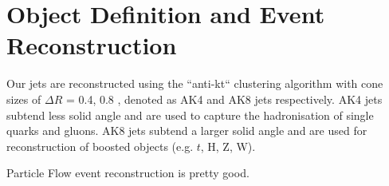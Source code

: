 \chapter{Object Definition and Event Reconstruction}
\label{chap:eventreco}

Our jets are reconstructed using the ``anti-kt`` clustering algorithm with cone sizes of $\Delta R$ = 0.4, 0.8 \cite{1126-6708-2008-04-063}, denoted as AK4 and AK8 jets respectively. AK4 jets subtend less solid angle and are used to capture the hadronisation of single quarks and gluons. AK8 jets subtend a larger solid angle and are used for reconstruction of boosted objects (e.g. $t$, H, Z, W).

Particle Flow event reconstruction is pretty good.\cite{CMS-PRF-14-001}
